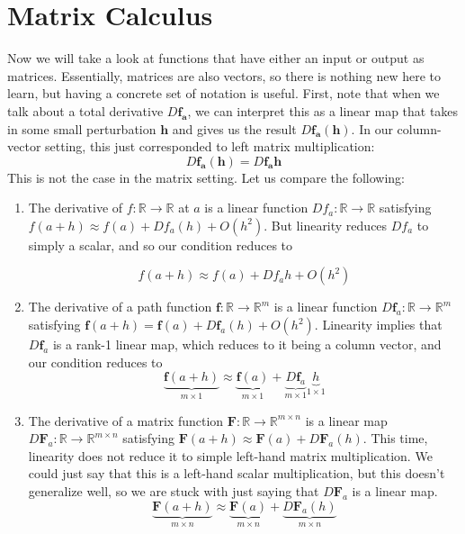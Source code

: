 \section{Matrix Calculus}

  Now we will take a look at functions that have either an input or output as matrices. Essentially, matrices are also vectors, so there is nothing new here to learn, but having a concrete set of notation is useful. First, note that when we talk about a total derivative $D \mathbf{f}_\mathbf{a}$, we can interpret this as a linear map that takes in some small perturbation $\mathbf{h}$ and gives us the result $D \mathbf{f}_\mathbf{a} (\mathbf{h})$. In our column-vector setting, this just corresponded to left matrix multiplication: 
  \[D \mathbf{f}_\mathbf{a} (\mathbf{h}) = D \mathbf{f}_\mathbf{a} \mathbf{h}\]
  This is not the case in the matrix setting. Let us compare the following: 
  \begin{enumerate}
      \item The derivative of $f: \mathbb{R} \rightarrow \mathbb{R}$ at $a$ is a linear function $D f_a: \mathbb{R} \longrightarrow \mathbb{R}$ satisfying $f(a + h) \approx f(a) + D f_a (h) + O(h^2)$. But linearity reduces $D f_a$ to simply a scalar, and so our condition reduces to 
      
      \[f(a + h) \approx f(a) + D f_a h + O(h^2)\]
      
      \item The derivative of a path function $\mathbf{f}: \mathbb{R} \rightarrow \mathbb{R}^m$ is a linear function $D \mathbf{f}_a : \mathbb{R} \longrightarrow \mathbb{R}^m$ satisfying $\mathbf{f}(a + h) = \mathbf{f}(a) + D \mathbf{f}_a (h) + O(h^2)$. Linearity implies that $D \mathbf{f}_a$ is a rank-1 linear map, which reduces to it being a column vector, and our condition reduces to 
      \[\underbrace{\mathbf{f}(a + h)}_{m \times 1} \approx \underbrace{\mathbf{f}(a)}_{m \times 1} + \underbrace{D \mathbf{f}_a}_{m \times 1} \underbrace{h}_{1 \times 1}\]
      
      \item The derivative of a matrix function $\mathbf{F}: \mathbb{R} \rightarrow \mathbb{R}^{m \times n}$ is a linear map $D \mathbf{F}_a: \mathbb{R} \longrightarrow \mathbb{R}^{m \times n}$ satisfying $\mathbf{F}(a + h) \approx \mathbf{F}(a) + D \mathbf{F}_a (h)$. This time, linearity does not reduce it to simple left-hand matrix multiplication. We could just say that this is a left-hand scalar multiplication, but this doesn't generalize well, so we are stuck with just saying that $D \mathbf{F}_a$ is a linear map. 
      \[\underbrace{\mathbf{F}(a + h)}_{m \times n} \approx \underbrace{\mathbf{F}(a)}_{m \times n} + \underbrace{D \mathbf{F}_a (h)}_{m \times n}\]
  \end{enumerate}
